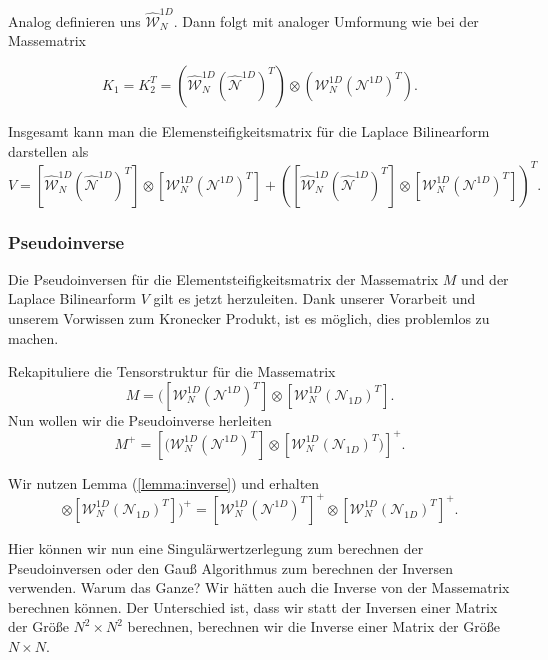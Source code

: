 Analog definieren uns $\widehat{\mathcal{W}}^{1D}_N$.
Dann folgt mit analoger Umformung wie bei der Massematrix

\begin{equation}
K_1 = K_2^T = (\widehat{\mathcal{W}}_N^{1D} (\widehat{\mathcal{N}}^{1D})^T) \otimes (\mathcal{W}_N^{1D} (\mathcal{N}^{1D})^T).
\end{equation}


Insgesamt kann man die Elemensteifigkeitsmatrix für die Laplace Bilinearform darstellen als
\begin{equation}
V =[\widehat{\mathcal{W}}_N^{1D} (\widehat{\mathcal{N}}^{1D})^T] \otimes [\mathcal{W}_N^{1D} (\mathcal{N}^{1D})^T] + ([\widehat{\mathcal{W}}_N^{1D} (\widehat{\mathcal{N}}^{1D})^T] \otimes [\mathcal{W}_N^{1D} (\mathcal{N}^{1D})^T])^T.
\end{equation}


\subsubsection{Pseudoinverse}

Die Pseudoinversen für die Elementsteifigkeitsmatrix der Massematrix $M$ und der Laplace Bilinearform $V$ gilt es jetzt herzuleiten. Dank unserer Vorarbeit und unserem Vorwissen zum Kronecker Produkt, ist es möglich, dies problemlos zu machen.

Rekapituliere die Tensorstruktur für die Massematrix
\begin{equation}
M =  ([\mathcal{W}_N^{1D} (\mathcal{N}^{1D})^T] \otimes [\mathcal{W}_N^{1D} (\mathcal{N}_{1D})^T].
\end{equation}
Nun wollen wir die Pseudoinverse herleiten
\begin{equation}
M^+=  [(\mathcal{W}_N^{1D} (\mathcal{N}^{1D})^T] \otimes [\mathcal{W}_N^{1D} (\mathcal{N}_{1D})^T)]^+ .
\end{equation}

Wir nutzen Lemma (\ref{lemma:inverse}) und erhalten
\begin{equation}
[(\mathcal{W}_N^{1D} (\mathcal{N}^{1D})^T] \otimes [\mathcal{W}_N^{1D} (\mathcal{N}_{1D})^T])^+ =  [\mathcal{W}_N^{1D} (\mathcal{N}^{1D})^T]^+ \otimes [\mathcal{W}_N^{1D} (\mathcal{N}_{1D})^T]^+.
\end{equation}

Hier können wir nun eine Singulärwertzerlegung zum berechnen der Pseudoinversen oder den Gauß Algorithmus zum berechnen der Inversen verwenden. Warum das Ganze? Wir hätten auch die Inverse von der Massematrix berechnen können. Der Unterschied ist, dass wir statt der Inversen einer Matrix der Größe $N^2 \times N^2$ berechnen, berechnen wir die Inverse einer Matrix der Größe $N \times N$.

